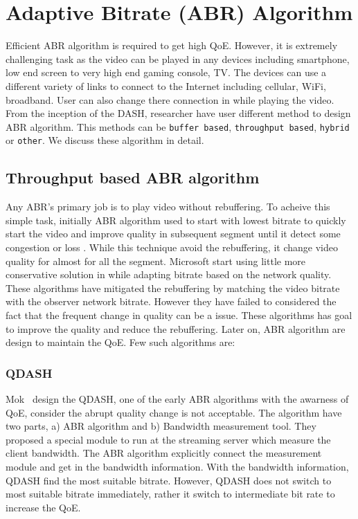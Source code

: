 \section{Adaptive Bitrate (ABR) Algorithm}
Efficient ABR algorithm is required to get high QoE. However, it is extremely challenging task as the video can be played in any devices including smartphone, low end screen to very high end gaming console, TV. The devices can use a different variety of links to connect to the Internet including cellular, WiFi, broadband. User can also change there connection in while playing the video. From the inception of the DASH, researcher have user different method to design ABR algorithm. This methods can be {\tt buffer based}, {\tt throughput based}, {\tt hybrid} or {\tt other}. We discuss these algorithm in detail.

\subsection{Throughput based ABR algorithm}
Any ABR's primary job is to play video without rebuffering. To acheive this simple task, initially ABR algorithm used to start with lowest bitrate to quickly start the video and improve quality in subsequent segment until it detect some congestion or loss \cite{5677508,10.1145/1943552.1943575}. While this technique avoid the rebuffering, it change video quality for almost for all the segment. Microsoft start using little more conservative solution in \cite{10.1145/1943552.1943574} while adapting bitrate based on the network quality. These algorithms have mitigated the rebuffering by matching the video bitrate with the observer network bitrate. However they have failed to considered the fact that the frequent change in quality can be a issue. These algorithms has goal to improve the quality and reduce the rebuffering. Later on, ABR algorithm are design to maintain the QoE. Few such algorithms are:

\subsubsection{QDASH\cite{10.1145/2155555.2155558}}
Mok \etal\ design the QDASH\cite{10.1145/2155555.2155558}, one of the early ABR algorithms with the awarness of QoE, consider the abrupt quality change is not acceptable. The algorithm have two parts, a) ABR algorithm and b) Bandwidth measurement tool. They proposed a special module to run at the streaming server which measure the client bandwidth. The ABR algorithm explicitly connect the measurement module and get in the bandwidth information. With the bandwidth information, QDASH find the most suitable bitrate. However, QDASH does not switch to most suitable bitrate immediately, rather it switch to intermediate bit rate to increase the QoE.


